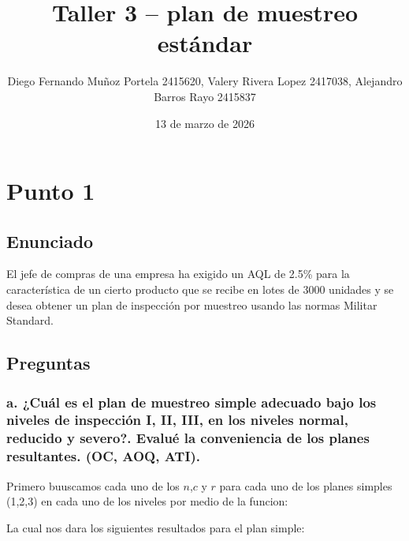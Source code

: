 \documentclass[
  12pt,
]{article}
\title{Taller 3 -- plan de muestreo estándar}
\author{Diego Fernando Muñoz Portela 2415620, Valery Rivera Lopez
2417038, Alejandro Barros Rayo 2415837}
\date{13 de marzo de 2026}
\begin{document}
\maketitle

{
\setcounter{tocdepth}{3}
\tableofcontents
}
\section{Punto 1}\label{punto-1}

\subsection{Enunciado}\label{enunciado}

El jefe de compras de una empresa ha exigido un AQL de 2.5\% para la
característica de un cierto producto que se recibe en lotes de 3000
unidades y se desea obtener un plan de inspección por muestreo usando
las normas Militar Standard.

\subsection{Preguntas}\label{preguntas}

\subsubsection{a. ¿Cuál es el plan de muestreo simple adecuado bajo los
niveles de inspección I, II, III, en los niveles normal, reducido y
severo?. Evalué la conveniencia de los planes resultantes. (OC, AOQ,
ATI).}\label{a.-cuuxe1l-es-el-plan-de-muestreo-simple-adecuado-bajo-los-niveles-de-inspecciuxf3n-i-ii-iii-en-los-niveles-normal-reducido-y-severo.-evaluuxe9-la-conveniencia-de-los-planes-resultantes.-oc-aoq-ati.}

Primero buuscamos cada uno de los \(n\),\(c\) y \(r\) para cada uno de
los planes simples (1,2,3) en cada uno de los niveles por medio de la
funcion:

La cual nos dara los siguientes resultados para el plan simple:
\end{document}
